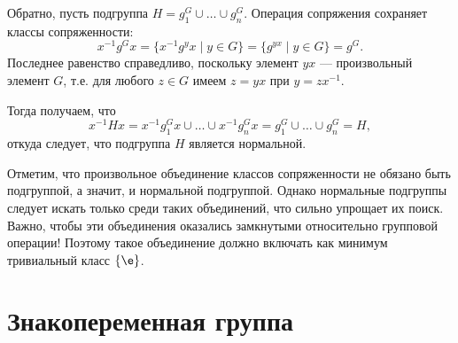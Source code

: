 \begin{enumerate}
Обратно, пусть подгруппа $H=g_1^G\cup\dots\cup g_n^G$. Операция сопряжения сохраняет классы сопряженности:
$$
x^{-1}g^Gx=\{x^{-1}g^yx\mid y\in G\} = \{g^{yx}\mid y\in G\}=g^G.
$$
Последнее равенство справедливо, поскольку элемент $yx$ --- произвольный элемент $G$, т.е. для любого $z\in G$ имеем $z=yx$ при $y=zx^{-1}$.

Тогда получаем, что
$$
x^{-1}Hx=x^{-1}g_1^Gx\cup\dots\cup x^{-1}g_n^Gx =g_1^G\cup\dots\cup g_n^G=H,
$$
откуда следует, что подгруппа $H$ является нормальной.
\epf

Отметим, что произвольное объединение классов сопряженности не обязано быть подгруппой, а значит, и нормальной подгруппой. Однако нормальные подгруппы следует искать только среди таких объединений, что сильно упрощает их поиск. Важно, чтобы эти объединения оказались замкнутыми относительно групповой операции! Поэтому такое объединение должно включать как минимум тривиальный класс $\{\e\}$.
\end{enumerate}




\section{Знакопеременная группа}



